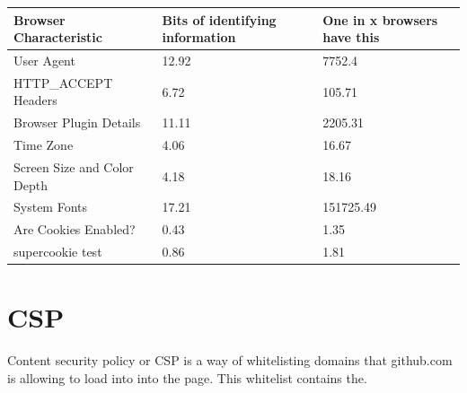 \documentclass[12pt]{article}
\makeatletter
\renewenvironment{figure}
               {\def\@captype {figure}}
               {}
\renewenvironment{table}
               {\def\@captype {table}}
               {}
\makeatother
\begin{document}
\begin{enumerate}
\begin{figure}
\begin{table}
\begin{tabular}{| l | p{7cm} | p{7cm} |}
\hline
\textbf{Browser Characteristic} & \textbf{Bits of identifying information} & \textbf{One in x browsers have this} \\ \hline
User Agent & 12.92  & 7752.4 \\ \hline
HTTP\_ACCEPT Headers   & 6.72   & 105.71  \\ \hline
Browser Plugin Details          & 11.11 & 2205.31  \\ \hline
Time Zone                       & 4.06                                     & 16.67                                \\ \hline
Screen Size and Color Depth     & 4.18                                     & 18.16                                \\ \hline
System Fonts                    & 17.21                                    & 151725.49                            \\ \hline
Are Cookies Enabled?            & 0.43                                     & 1.35                                 \\ \hline
supercookie test                & 0.86                                     & 1.81                                 \\ \hline
\end{tabular}
\end{table}
\caption{\newline}
\label{fig:mig_over}
\end{figure}


\end{enumerate}

\section{CSP}
Content security policy or CSP is a way of whitelisting domains that github.com is allowing to load into into the page. This whitelist contains the.\\
\end{document}
